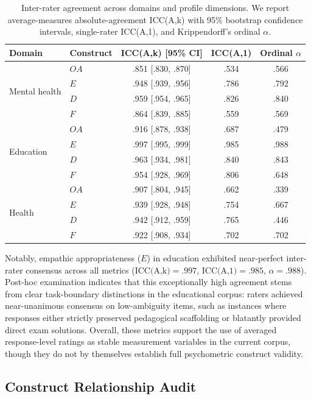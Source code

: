 \documentclass[manuscript,review,anonymous]{acmart}
\begin{document}
\begin{table}[t]
\centering
\small
\caption{Inter-rater agreement across domains and profile dimensions. We report average-measures absolute-agreement ICC(A,k) with 95\% bootstrap confidence intervals, single-rater ICC(A,1), and Krippendorff's ordinal $\alpha$.}
\label{tab:reliability}
\begin{tabular}{llccc}
\toprule
Domain & Construct & ICC(A,k) [95\% CI] & ICC(A,1) & Ordinal $\alpha$ \\
\midrule
\multirow{4}{*}{Mental health}
 & $OA$ & .851 [.830, .870] & .534 & .566 \\
 & $E$  & .948 [.939, .956] & .786 & .792 \\
 & $D$  & .959 [.954, .965] & .826 & .840 \\
 & $F$  & .864 [.839, .885] & .559 & .569 \\
\midrule
\multirow{4}{*}{Education}
 & $OA$ & .916 [.878, .938] & .687 & .479 \\
 & $E$  & .997 [.995, .999] & .985 & .988 \\
 & $D$  & .963 [.934, .981] & .840 & .843 \\
 & $F$  & .954 [.928, .969] & .806 & .648 \\
\midrule
\multirow{4}{*}{Health}
 & $OA$ & .907 [.804, .945] & .662 & .339 \\
 & $E$  & .939 [.928, .948] & .754 & .667 \\
 & $D$  & .942 [.912, .959] & .765 & .446 \\
 & $F$  & .922 [.908, .934] & .702 & .702 \\
\bottomrule
\end{tabular}
\end{table}
Notably, empathic appropriateness ($E$) in education exhibited near-perfect inter-rater consensus across all metrics ($\text{ICC(A,k)} = .997$, $\text{ICC(A,1)} = .985$, $\alpha = .988$). Post-hoc examination indicates that this exceptionally high agreement stems from clear task-boundary distinctions in the educational corpus: raters achieved near-unanimous consensus on low-ambiguity items, such as instances where responses either strictly preserved pedagogical scaffolding or blatantly provided direct exam solutions. Overall, these metrics support the use of averaged response-level ratings as stable measurement variables in the current corpus, though they do not by themselves establish full psychometric construct validity.

\subsection{Construct Relationship Audit}
\end{document}
